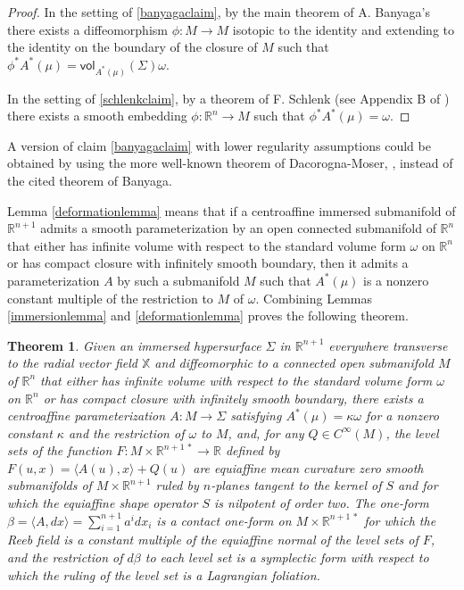 \documentclass [leqno, 10pt]{amsart}
\newtheorem{theorem}{Theorem}[section]
\theoremstyle{definition}
\numberwithin{equation}{section}
\newcommand{\om}{\omega}
\newcommand{\vol}{\mathsf{vol}}
\newcommand{\ka}{\kappa}
\newcommand{\cinf}{C^{\infty}}
\newcommand{\lb}{\langle}
\newcommand{\ra}{\rangle}
\newcommand{\be}{\beta}
\newcommand{\eul}{\mathbb{X}}
\newcommand{\rea}{\mathbb R}
\begin{document}
\begin{proof}
In the setting of \eqref{banyagaclaim}, by the main theorem of A. Banyaga's \cite{Banyaga-formes-volumes} there exists a diffeomorphism $\phi:M \to M$ isotopic to the identity and extending to the identity on the boundary of the closure of $M$ such that $\phi^{\ast}A^{\ast}(\mu) = \vol_{A^{\ast}(\mu)}(\Sigma)\om$.

In the setting of \eqref{schlenkclaim}, by a theorem of F. Schlenk (see Appendix B of \cite{Schlenk-book}) there exists a smooth embedding $\phi:\rea^{n} \to M$ such that $\phi^{\ast}A^{\ast}(\mu) = \om$.
\end{proof}
A version of claim \eqref{banyagaclaim} with lower regularity assumptions could be obtained by using the more well-known theorem of Dacorogna-Moser, \cite{Dacorogna-Moser}, instead of the cited theorem of Banyaga. 

Lemma \ref{deformationlemma} means that if a centroaffine immersed submanifold of $\rea^{n+1}$ admits a smooth parameterization by an open connected submanifold of $\rea^{n}$ that either has infinite volume with respect to the standard volume form $\om$ on $\rea^{n}$ or has compact closure with infinitely smooth boundary, then it admits a parameterization $A$ by such a submanifold $M$ such that $A^{\ast}(\mu)$ is a nonzero constant multiple of the restriction to $M$ of $\om$. Combining Lemmas \ref{immersionlemma} and \ref{deformationlemma} proves the following theorem.

\begin{theorem}\label{lifttheorem}
Given an immersed hypersurface $\Sigma$ in $\rea^{n+1}$ everywhere transverse to the radial vector field $\eul$ and diffeomorphic to a connected open submanifold $M$ of $\rea^{n}$ that either has infinite volume with respect to the standard volume form $\om$ on $\rea^{n}$ or has compact closure with infinitely smooth boundary, there exists a centroaffine parameterization $A:M \to \Sigma$ satisfying $A^{\ast}(\mu) = \ka \om$ for a nonzero constant $\ka$ and the restriction of $\om$ to $M$, and, for any $Q \in \cinf(M)$, the level sets of the function $F:M \times \rea^{n+1\,\ast} \to \rea$ defined by $F(u, x) =\lb A(u), x\ra + Q(u)$ are equiaffine mean curvature zero smooth submanifolds of $M \times \rea^{n+1}$  ruled by $n$-planes tangent to the kernel of $S$ and for which the equiaffine shape operator $S$ is nilpotent of order two. The one-form $\be = \lb A, dx \ra = \sum_{i = 1}^{n+1}a^{i}dx_{i}$ is a contact one-form on $M \times \rea^{n+1\,\ast}$ for which the Reeb field is a constant multiple of the equiaffine normal of the level sets of $F$, and the restriction of $d\be$ to each level set is a symplectic form with respect to which the ruling of the level set is a Lagrangian foliation.
\end{theorem}
\end{document}
